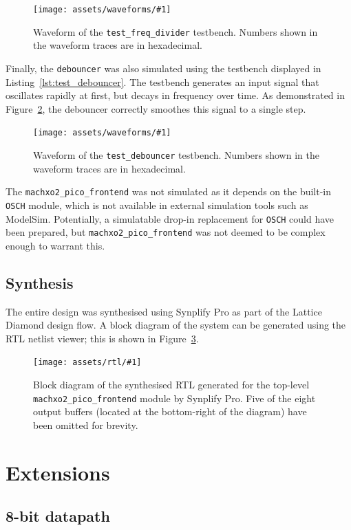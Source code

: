 \documentclass[a4paper]{article}
\newcommand{\waveformfigure}[2]{
  \begin{figure}[tp]
    \centering\texttt{[image: assets/waveforms/\#1]}
    \caption{#2}
    \label{fig:wave:#1}
  \end{figure}
}
\newcommand{\rtlfigure}[2]{
  \begin{figure}[tp]
    \centering\texttt{[image: assets/rtl/\#1]}
    \caption{#2}
    \label{fig:rtl:#1}
  \end{figure}
}
\begin{document}
\waveformfigure{test_freq_divider}{Waveform of the \texttt{test\_freq\_divider} testbench. Numbers shown in the waveform traces are in hexadecimal.}

Finally, the \texttt{debouncer} was also simulated using the testbench displayed in Listing~\ref{lst:test_debouncer}. The testbench generates an input signal that oscillates rapidly at first, but decays in frequency over time. As demonstrated in Figure~\ref{fig:wave:test_debouncer}, the debouncer correctly smoothes this signal to a single step.

\waveformfigure{test_debouncer}{Waveform of the \texttt{test\_debouncer} testbench. Numbers shown in the waveform traces are in hexadecimal.}

The \texttt{machxo2\_pico\_frontend} was not simulated as it depends on the built-in \texttt{OSCH} module, which is not available in external simulation tools such as ModelSim. Potentially, a simulatable drop-in replacement for \texttt{OSCH} could have been prepared, but \texttt{machxo2\_pico\_frontend} was not deemed to be complex enough to warrant this.

\subsection{Synthesis}
\label{sec:mult:synth}

The entire design was synthesised using Synplify Pro as part of the Lattice Diamond design flow. A block diagram of the system can be generated using the RTL netlist viewer; this is shown in Figure~\ref{fig:rtl:machxo2_pico_frontend}.

\rtlfigure{machxo2_pico_frontend}{Block diagram of the synthesised RTL generated for the top-level \texttt{machxo2\_pico\_frontend} module by Synplify Pro. Five of the eight output buffers (located at the bottom-right of the diagram) have been omitted for brevity.}


\section{Extensions}
\label{sec:ext}

\subsection{8-bit datapath}
\label{sec:ext:8bit}

\end{document}
